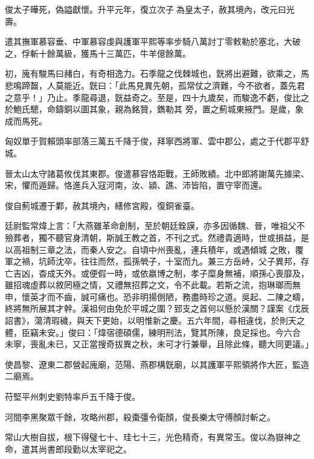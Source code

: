 \begin{pinyinscope}
 俊太子曄死，偽謚獻懷。升平元年，復立次子為皇太子，赦其境內，改元曰光壽。



 遣其撫軍慕容垂、中軍慕容虔與護軍平熙等率步騎八萬討丁零敕勒於塞北，大破之，俘斬十餘萬級，獲馬十三萬匹，牛羊億餘萬。



 初，廆有駿馬曰赭白，有奇相逸力。石季龍之伐棘城也，皝將出避難，欲乘之，馬悲鳴蹄齧，人莫能近。皝曰：「此馬見異先朝，孤常仗之濟難，今不欲者，蓋先君之意乎！」乃止。季龍尋退，皝益奇之。至是，四十九歲矣，而駿逸不虧，俊比之於鮑氏驄，命鑄銅以圖其象，親為銘贊，鐫勒其
 旁，置之薊城東掖門。是歲，象成而馬死。



 匈奴單于賀賴頭率部落三萬五千降于俊，拜寧西將軍、雲中郡公，處之于代郡平舒城。



 晉太山太守諸葛攸伐其東郡。俊遣慕容恪距戰，王師敗績。北中郎將謝萬先據梁、宋，懼而遁歸。恪進兵入寇河南，汝、潁、譙、沛皆陷，置守宰而還。



 俊自薊城遷于鄴，赦其境內，繕修宮殿，復銅雀臺。



 廷尉監常煒上言：「大燕雖革命創制，至於朝廷銓謨，亦多因循魏、晉，唯祖父不殮葬者，獨不聽官身清朝，斯誠王教之首，不刊之式。然禮貴適時，世或損益，是以高祖制三章之法，而秦人安之。自頃中州喪亂，連兵積年，或遇傾城
 之敗，覆軍之禍，坑師沈卒，往往而然，孤孫煢子，十室而九。兼三方岳峙，父子異邦，存亡吉凶，杳成天外。或便假一時，或依嬴博之制，孝子糜身無補，順孫心喪靡及，雖招魂虛葬以敘罔極之情，又禮無招葬之文，令不此載。若斯之流，抱琳瑯而無申，懷英才而不齒，誠可痛也。恐非明揚側陋，務盡時珍之道。吳起、二陳之疇，終將無所展其才幹。漢祖何由免於平城之圍？郅支之首何以懸於漢關？謹案《戊辰詔書》，蕩清瑕穢，與天下更始，以明惟新之慶。五六年間，尋相違伐，於則天之體，臣竊未安。」俊曰：「煒宿德碩儒，練明刑法，覽其所陳，良足採也。今六合
 未寧，喪亂未已，又正當搜奇拔異之秋，未可才行兼舉，且除此條，聽大同更議。」



 使昌黎、遼東二郡營起廆廟，范陽、燕郡構皝廟，以其護軍平熙領將作大匠，監造二廟焉。



 苻堅平州刺史劉特率戶五千降于俊。



 河間李黑聚眾千餘，攻略州郡，殺棗彊令衛顏，俊長樂太守傅顏討斬之。



 常山大樹自拔，根下得璧七十、珪七十三，光色精奇，有異常玉。俊以為嶽神之命，遣其尚書郎段勤以太宰祀之。




\end{pinyinscope}

